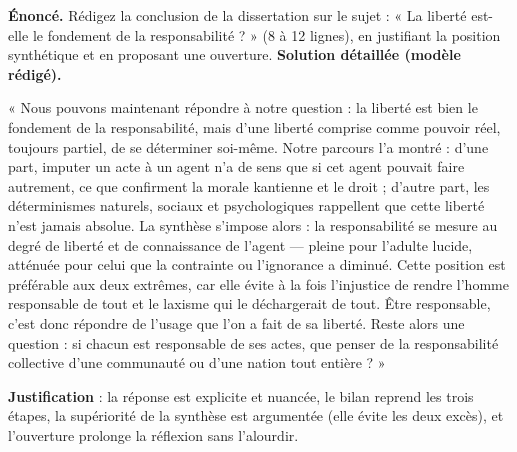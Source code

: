 \documentclass[11pt]{article}
\begin{document}
\begin{exoresolu}
\textbf{Énoncé.} Rédigez la conclusion de la dissertation sur le sujet : « La liberté est-elle le fondement de la responsabilité ? » (8 à 12 lignes), en justifiant la position synthétique et en proposant une ouverture.
\tcblower
\textbf{Solution détaillée (modèle rédigé).}

« Nous pouvons maintenant répondre à notre question : la liberté est bien le fondement de la responsabilité, mais d'une liberté comprise comme pouvoir réel, toujours partiel, de se déterminer soi-même. Notre parcours l'a montré : d'une part, imputer un acte à un agent n'a de sens que si cet agent pouvait faire autrement, ce que confirment la morale kantienne et le droit ; d'autre part, les déterminismes naturels, sociaux et psychologiques rappellent que cette liberté n'est jamais absolue. La synthèse s'impose alors : la responsabilité se mesure au degré de liberté et de connaissance de l'agent — pleine pour l'adulte lucide, atténuée pour celui que la contrainte ou l'ignorance a diminué. Cette position est préférable aux deux extrêmes, car elle évite à la fois l'injustice de rendre l'homme responsable de tout et le laxisme qui le déchargerait de tout. Être responsable, c'est donc répondre de l'usage que l'on a fait de sa liberté. Reste alors une question : si chacun est responsable de ses actes, que penser de la responsabilité collective d'une communauté ou d'une nation tout entière ? »

\textbf{Justification} : la réponse est explicite et nuancée, le bilan reprend les trois étapes, la supériorité de la synthèse est argumentée (elle évite les deux excès), et l'ouverture prolonge la réflexion sans l'alourdir.
\end{exoresolu}
\end{document}
